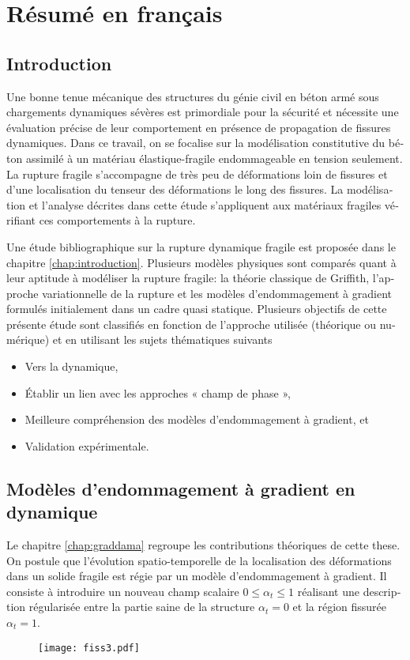 
\chapter{Résumé en français}
\begin{otherlanguage}{french}

\section*{Introduction}
Une bonne tenue mécanique des structures du génie civil en béton armé sous chargements dynamiques sévères est primordiale pour la sécurité et nécessite une évaluation précise de leur comportement en présence de propagation de fissures dynamiques. Dans ce travail, on se focalise sur la modélisation constitutive du béton assimilé à un matériau élastique-fragile endommageable en tension seulement. La rupture fragile s'accompagne de très peu de déformations loin de fissures et d'une localisation du tenseur des déformations le long des fissures. La modélisation et l'analyse décrites dans cette étude s'appliquent aux matériaux fragiles vérifiant ces comportements à la rupture.

Une étude bibliographique sur la rupture dynamique fragile est proposée dans le chapitre \ref{chap:introduction}. Plusieurs modèles physiques sont comparés quant à leur aptitude à modéliser la rupture fragile: la théorie classique de Griffith, l'approche variationnelle de la rupture et les modèles d'endommagement à gradient formulés initialement dans un cadre quasi statique. Plusieurs objectifs de cette présente étude sont classifiés en fonction de l'approche utilisée (théorique ou numérique) et en utilisant les sujets thématiques suivants
\begin{itemize}
\item Vers la dynamique,
\item Établir un lien avec les approches « champ de phase »,
\item Meilleure compréhension des modèles d'endommagement à gradient, et
\item Validation expérimentale.
\end{itemize}

\section*{Modèles d'endommagement à gradient en dynamique}
Le chapitre \ref{chap:graddama} regroupe les contributions théoriques de cette these. On postule que l'évolution spatio-temporelle de la localisation des déformations dans un solide fragile est régie par un modèle d'endommagement à gradient. Il consiste à introduire un nouveau champ scalaire $0\leq\alpha_t\leq 1$ réalisant une description régularisée entre la partie saine de la structure $\alpha_t=0$ et la région fissurée $\alpha_t=1$.
\begin{figure}[htbp]
\centering
\texttt{[image: fiss3.pdf]}
\end{figure}


\end{otherlanguage}
